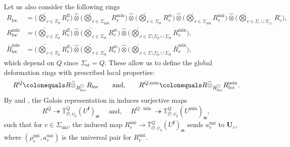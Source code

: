 \documentclass[a4paper, notitlepage, 10pt]{amsart}
\theoremstyle{plain} %
\theoremstyle{definition} %
\theoremstyle{remark} %
\numberwithin{equation}{section}
\newcommand{\uni}{\operatorname{uni}}
\newcommand{\st}{\operatorname{st}}
\begin{document}
Let us also consider the following rings
\begin{align*}
    R_{\text{loc}}&= \Big(\widehat{\bigotimes}_{v\in \Sigma_p} R_v^{\text{fl}}\Big)\widehat{\otimes} \Big(\widehat{\bigotimes}_{v\in \Sigma_{\min}}R_v^{\min}\Big)\widehat{\otimes} \Big(\widehat{\bigotimes}_{v\in \Sigma_{\st}}R_v^{\st}\Big)\widehat{\otimes} \Big(\widehat{\bigotimes}_{v\in \Sigma_{\uni}}R_v^{\uni}\Big)\widehat{\otimes} \Big(\widehat{\bigotimes}_{v\in \Sigma_\square \cup \Sigma_\triangle}R_v^{\square}\Big),
     \\  R_{\text{loc}}^{\min} &= \Big(\widehat{\bigotimes}_{v\in \Sigma_p} R_v^{\text{fl}}\Big) \widehat{\otimes}\Big(\widehat{\bigotimes}_{v\in \Sigma_{\st}}R^{\st}_v\Big)\widehat{\otimes} \Big(\widehat{\bigotimes}_{v\in \Sigma\setminus \Sigma_p\cup \Sigma_{\st}}R_v^{\min}  \Big),
     \\  \overline{R}_{\text{loc}}^{\min} &= \Big(\widehat{\bigotimes}_{v\in \Sigma_p} R_v^{\text{fl}}\Big) \widehat{\otimes}\Big(\widehat{\bigotimes}_{v\in \Sigma_{\st}}R^{\st}_v\Big)\widehat{\otimes} \Big(\widehat{\bigotimes}_{v\in \Sigma\setminus \Sigma_p\cup \Sigma_{\st}}\overline{R}_v^{\min}  \Big),
\end{align*}
which depend on $Q$ since $\Sigma_{\st}=Q$. These allow us to define the global deformation rings with prescribed local properties: 
$$R^{Q}\colonequals R \widehat{\otimes}_{R^\square_\text{loc}} R_\text{loc}\quad  \quad \text{and,}\quad  \quad R^{Q,\min}\colonequals R \widehat{\otimes}_{R^\square_\text{loc}} R_\text{loc}^{\min}.$$
By \cite[Lemma 2.4]{Man21} and \cite[Lemmma 6.3]{BKM2}, the Galois representation in  induces surjective maps 
$$R^{Q}\twoheadrightarrow \overline{\mathbb{T}}{}^{Q}_{\mathcal{O},\psi_0}(U^{\mathbf{f}})_{\mathfrak{m}} \quad \text{   and,   } \quad R^{Q,\min}\twoheadrightarrow \mathbb{T}^{Q}_{\mathcal{O},\psi_0}(U^{\min})_{\mathfrak{m}},$$
such that for $v\in \Sigma_{\uni}$, the induced map $R^{\uni}_v\to \overline{\mathbb{T}}{}^{Q}_{\mathcal{O},\psi_0}(U^{\mathbf{f}})_{\mathfrak{m}}$ sends $a_v^{\uni}$ to $\mathbf{U}_v$, where $(\rho^{\uni}_v,a_v^{\uni})$ is the universal pair for $R^{\uni}_v$.
\end{document}
